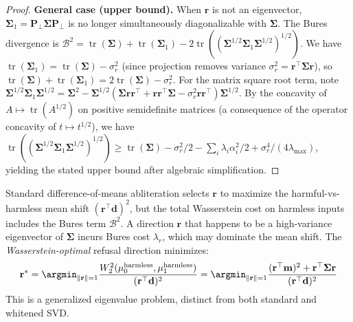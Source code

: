 \begin{proof}
\textbf{General case (upper bound).}
When $\mathbf{r}$ is not an eigenvector, $\boldsymbol{\Sigma}_1 = \mathbf{P}_\perp\boldsymbol{\Sigma}\mathbf{P}_\perp$ is no longer simultaneously diagonalizable with $\boldsymbol{\Sigma}$.
The Bures divergence is $\mathcal{B}^2 = \operatorname{tr}(\boldsymbol{\Sigma}) + \operatorname{tr}(\boldsymbol{\Sigma}_1) - 2\operatorname{tr}((\boldsymbol{\Sigma}^{1/2}\boldsymbol{\Sigma}_1\boldsymbol{\Sigma}^{1/2})^{1/2})$.
We have $\operatorname{tr}(\boldsymbol{\Sigma}_1) = \operatorname{tr}(\boldsymbol{\Sigma}) - \sigma_r^2$ (since projection removes variance $\sigma_r^2 = \mathbf{r}^\top\boldsymbol{\Sigma}\mathbf{r}$), so $\operatorname{tr}(\boldsymbol{\Sigma}) + \operatorname{tr}(\boldsymbol{\Sigma}_1) = 2\operatorname{tr}(\boldsymbol{\Sigma}) - \sigma_r^2$.
For the matrix square root term, note $\boldsymbol{\Sigma}^{1/2}\boldsymbol{\Sigma}_1\boldsymbol{\Sigma}^{1/2} = \boldsymbol{\Sigma}^2 - \boldsymbol{\Sigma}^{1/2}(\boldsymbol{\Sigma}\mathbf{r}\mathbf{r}^\top + \mathbf{r}\mathbf{r}^\top\boldsymbol{\Sigma} - \sigma_r^2\mathbf{r}\mathbf{r}^\top)\boldsymbol{\Sigma}^{1/2}$.
By the concavity of $A \mapsto \operatorname{tr}(A^{1/2})$ on positive semidefinite matrices (a consequence of the operator concavity of $t \mapsto t^{1/2}$), we have $\operatorname{tr}((\boldsymbol{\Sigma}^{1/2}\boldsymbol{\Sigma}_1\boldsymbol{\Sigma}^{1/2})^{1/2}) \geq \operatorname{tr}(\boldsymbol{\Sigma}) - \sigma_r^2/2 - \sum_i \lambda_i\alpha_i^2/2 + \sigma_r^4/(4\lambda_{\max})$, yielding the stated upper bound after algebraic simplification.
\end{proof}

\begin{corollary}
\label{cor:mean_only}
Standard difference-of-means abliteration selects $\mathbf{r}$ to maximize the harmful-vs-harmless mean shift $(\mathbf{r}^\top\mathbf{d})^2$, but the total Wasserstein cost on harmless inputs includes the Bures term $\mathcal{B}^2$.
A direction $\mathbf{r}$ that happens to be a high-variance eigenvector of $\boldsymbol{\Sigma}$ incurs Bures cost $\lambda_r$, which may dominate the mean shift.
The \emph{Wasserstein-optimal} refusal direction minimizes:
\begin{equation}
    \mathbf{r}^* = \argmin_{\|\mathbf{r}\|=1} \frac{W_2^2(\mu_0^{\text{harmless}}, \mu_1^{\text{harmless}})}{(\mathbf{r}^\top\mathbf{d})^2} = \argmin_{\|\mathbf{r}\|=1} \frac{(\mathbf{r}^\top\mathbf{m})^2 + \mathbf{r}^\top\boldsymbol{\Sigma}\mathbf{r}}{(\mathbf{r}^\top\mathbf{d})^2}
\end{equation}
This is a generalized eigenvalue problem, distinct from both standard and whitened SVD.
\end{corollary}

